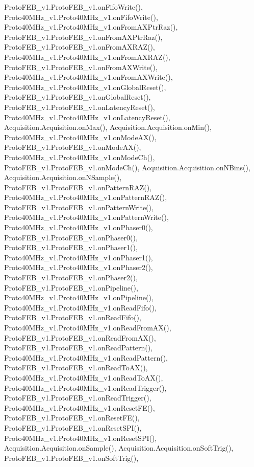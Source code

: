 Proto\+F\+E\+B\+\_\+v1.\+Proto\+F\+E\+B\+\_\+v1.\+on\+Fifo\+Write(), Proto40\+M\+Hz\+\_\+v1.\+Proto40\+M\+Hz\+\_\+v1.\+on\+Fifo\+Write(), Proto40\+M\+Hz\+\_\+v1.\+Proto40\+M\+Hz\+\_\+v1.\+on\+From\+A\+X\+Ptr\+Raz(), Proto\+F\+E\+B\+\_\+v1.\+Proto\+F\+E\+B\+\_\+v1.\+on\+From\+A\+X\+Ptr\+Raz(), Proto\+F\+E\+B\+\_\+v1.\+Proto\+F\+E\+B\+\_\+v1.\+on\+From\+A\+X\+R\+A\+Z(), Proto40\+M\+Hz\+\_\+v1.\+Proto40\+M\+Hz\+\_\+v1.\+on\+From\+A\+X\+R\+A\+Z(), Proto\+F\+E\+B\+\_\+v1.\+Proto\+F\+E\+B\+\_\+v1.\+on\+From\+A\+X\+Write(), Proto40\+M\+Hz\+\_\+v1.\+Proto40\+M\+Hz\+\_\+v1.\+on\+From\+A\+X\+Write(), Proto40\+M\+Hz\+\_\+v1.\+Proto40\+M\+Hz\+\_\+v1.\+on\+Global\+Reset(), Proto\+F\+E\+B\+\_\+v1.\+Proto\+F\+E\+B\+\_\+v1.\+on\+Global\+Reset(), Proto\+F\+E\+B\+\_\+v1.\+Proto\+F\+E\+B\+\_\+v1.\+on\+Latency\+Reset(), Proto40\+M\+Hz\+\_\+v1.\+Proto40\+M\+Hz\+\_\+v1.\+on\+Latency\+Reset(), Acquisition.\+Acquisition.\+on\+Max(), Acquisition.\+Acquisition.\+on\+Min(), Proto40\+M\+Hz\+\_\+v1.\+Proto40\+M\+Hz\+\_\+v1.\+on\+Mode\+A\+X(), Proto\+F\+E\+B\+\_\+v1.\+Proto\+F\+E\+B\+\_\+v1.\+on\+Mode\+A\+X(), Proto40\+M\+Hz\+\_\+v1.\+Proto40\+M\+Hz\+\_\+v1.\+on\+Mode\+Ch(), Proto\+F\+E\+B\+\_\+v1.\+Proto\+F\+E\+B\+\_\+v1.\+on\+Mode\+Ch(), Acquisition.\+Acquisition.\+on\+N\+Bins(), Acquisition.\+Acquisition.\+on\+N\+Sample(), Proto\+F\+E\+B\+\_\+v1.\+Proto\+F\+E\+B\+\_\+v1.\+on\+Pattern\+R\+A\+Z(), Proto40\+M\+Hz\+\_\+v1.\+Proto40\+M\+Hz\+\_\+v1.\+on\+Pattern\+R\+A\+Z(), Proto\+F\+E\+B\+\_\+v1.\+Proto\+F\+E\+B\+\_\+v1.\+on\+Pattern\+Write(), Proto40\+M\+Hz\+\_\+v1.\+Proto40\+M\+Hz\+\_\+v1.\+on\+Pattern\+Write(), Proto40\+M\+Hz\+\_\+v1.\+Proto40\+M\+Hz\+\_\+v1.\+on\+Phaser0(), Proto\+F\+E\+B\+\_\+v1.\+Proto\+F\+E\+B\+\_\+v1.\+on\+Phaser0(), Proto\+F\+E\+B\+\_\+v1.\+Proto\+F\+E\+B\+\_\+v1.\+on\+Phaser1(), Proto40\+M\+Hz\+\_\+v1.\+Proto40\+M\+Hz\+\_\+v1.\+on\+Phaser1(), Proto40\+M\+Hz\+\_\+v1.\+Proto40\+M\+Hz\+\_\+v1.\+on\+Phaser2(), Proto\+F\+E\+B\+\_\+v1.\+Proto\+F\+E\+B\+\_\+v1.\+on\+Phaser2(), Proto\+F\+E\+B\+\_\+v1.\+Proto\+F\+E\+B\+\_\+v1.\+on\+Pipeline(), Proto40\+M\+Hz\+\_\+v1.\+Proto40\+M\+Hz\+\_\+v1.\+on\+Pipeline(), Proto40\+M\+Hz\+\_\+v1.\+Proto40\+M\+Hz\+\_\+v1.\+on\+Read\+Fifo(), Proto\+F\+E\+B\+\_\+v1.\+Proto\+F\+E\+B\+\_\+v1.\+on\+Read\+Fifo(), Proto40\+M\+Hz\+\_\+v1.\+Proto40\+M\+Hz\+\_\+v1.\+on\+Read\+From\+A\+X(), Proto\+F\+E\+B\+\_\+v1.\+Proto\+F\+E\+B\+\_\+v1.\+on\+Read\+From\+A\+X(), Proto\+F\+E\+B\+\_\+v1.\+Proto\+F\+E\+B\+\_\+v1.\+on\+Read\+Pattern(), Proto40\+M\+Hz\+\_\+v1.\+Proto40\+M\+Hz\+\_\+v1.\+on\+Read\+Pattern(), Proto\+F\+E\+B\+\_\+v1.\+Proto\+F\+E\+B\+\_\+v1.\+on\+Read\+To\+A\+X(), Proto40\+M\+Hz\+\_\+v1.\+Proto40\+M\+Hz\+\_\+v1.\+on\+Read\+To\+A\+X(), Proto40\+M\+Hz\+\_\+v1.\+Proto40\+M\+Hz\+\_\+v1.\+on\+Read\+Trigger(), Proto\+F\+E\+B\+\_\+v1.\+Proto\+F\+E\+B\+\_\+v1.\+on\+Read\+Trigger(), Proto40\+M\+Hz\+\_\+v1.\+Proto40\+M\+Hz\+\_\+v1.\+on\+Reset\+F\+E(), Proto\+F\+E\+B\+\_\+v1.\+Proto\+F\+E\+B\+\_\+v1.\+on\+Reset\+F\+E(), Proto\+F\+E\+B\+\_\+v1.\+Proto\+F\+E\+B\+\_\+v1.\+on\+Reset\+S\+P\+I(), Proto40\+M\+Hz\+\_\+v1.\+Proto40\+M\+Hz\+\_\+v1.\+on\+Reset\+S\+P\+I(), Acquisition.\+Acquisition.\+on\+Sample(), Acquisition.\+Acquisition.\+on\+Soft\+Trig(), Proto\+F\+E\+B\+\_\+v1.\+Proto\+F\+E\+B\+\_\+v1.\+on\+Soft\+Trig(), 